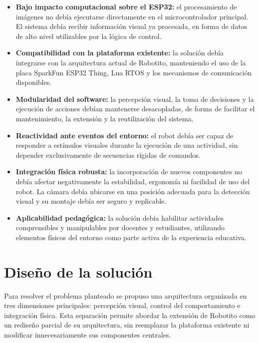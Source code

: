 \documentclass{prgrado}
\begin{document}
\begin{itemize}
    \item \textbf{Bajo impacto computacional sobre el ESP32:} el procesamiento de imágenes no debía ejecutarse directamente en el microcontrolador principal. El sistema debía recibir información visual ya procesada, en forma de datos de alto nivel utilizables por la lógica de control.

    \item \textbf{Compatibilidad con la plataforma existente:} la solución debía integrarse con la arquitectura actual de Robotito, manteniendo el uso de la placa SparkFun ESP32 Thing, Lua RTOS y los mecanismos de comunicación disponibles.

    \item \textbf{Modularidad del software:} la percepción visual, la toma de decisiones y la ejecución de acciones debían mantenerse desacopladas, de forma de facilitar el mantenimiento, la extensión y la reutilización del sistema.

    \item \textbf{Reactividad ante eventos del entorno:} el robot debía ser capaz de responder a estímulos visuales durante la ejecución de una actividad, sin depender exclusivamente de secuencias rígidas de comandos.

    \item \textbf{Integración física robusta:} la incorporación de nuevos componentes no debía afectar negativamente la estabilidad, ergonomía ni facilidad de uso del robot. La cámara debía ubicarse en una posición adecuada para la detección visual y su montaje debía ser seguro y replicable.

    \item \textbf{Aplicabilidad pedagógica:} la solución debía habilitar actividades comprensibles y manipulables por docentes y estudiantes, utilizando elementos físicos del entorno como parte activa de la experiencia educativa.
\end{itemize}

\section{Diseño de la solución}

Para resolver el problema planteado se propuso una arquitectura organizada en tres dimensiones principales: percepción visual, control del comportamiento e integración física. Esta separación permite abordar la extensión de Robotito como un rediseño parcial de su arquitectura, sin reemplazar la plataforma existente ni modificar innecesariamente sus componentes centrales.
\end{document}
